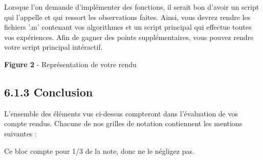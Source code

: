 \documentclass[11pt]{article}
\begin{document}
Lorsque l'on demande d'implémenter des fonctions, il serait bon d'avoir
un script qui l'appelle et qui ressort les observations faites. Ainsi,
vous devrez rendre les fichiers '.m' contenant vos algorithmes et un
script principal qui effectue toutes vos expériences. Afin de gagner des
points supplémentaires, vous pouvez rendre votre script principal
intéractif.

\textbf{Figure 2} - Représentation de votre rendu

    \subsection{6.1.3 Conclusion}\label{conclusion}

L'ensemble des éléments vus ci-dessus compteront dans l'évaluation de
vos compte rendus. Chacune de nos grilles de notation contiennent les
mentions suivantes :

Ce bloc compte pour 1/3 de la note, donc ne le négligez pas.


    
    
    
    
\end{document}

